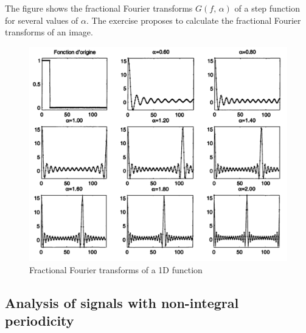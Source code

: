  
The figure  shows the fractional Fourier transforms $ G (f, \, \alpha) $ of a step function for several values of $ \alpha $. The exercise  proposes to calculate the fractional Fourier transforms of an image. \begin{figure}[ht]
    \begin{center}
    \includegraphics[scale=0.7]{images/transformee-fourier-fractionnaire-1d.png}
    \end{center}
    \caption{Fractional Fourier transforms of a 1D function}
              \label{fig-transforme-fourier-fractionionnaire-1d}
\end{figure}
 
\subsection{Analysis of signals with non-integral periodicity}
\label{sect2-applications-trans-frac-periodicite} 
 

